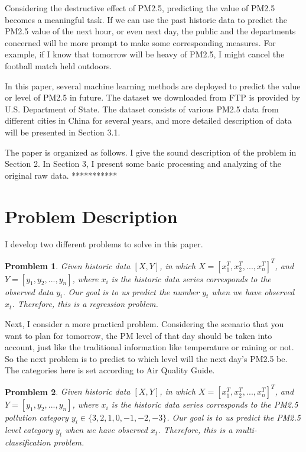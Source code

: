 \documentclass{sig-alternate}
\begin{document}
Considering the destructive effect of PM2.5, predicting the value of PM2.5 becomes a meaningful task. If we can use the past historic data to predict the PM2.5 value of the next hour, or even next day, the public and the departments concerned will be more prompt to make some corresponding measures. For example, if I know that tomorrow will be heavy of PM2.5, I might cancel the football match held outdoors.

In this paper, several machine learning methods are deployed to predict the value or level of PM2.5 in future. The dataset we downloaded from FTP is provided by U.S. Department of State\cite{data}. The dataset consists of various PM2.5 data from different cities in China for several years, and more detailed description of data will be presented in Section 3.1.

The paper is organized as follows. I give the sound description of the problem in Section 2. In Section 3, I present some basic processing and analyzing of the original raw data. ***********



\section{Problem Description}
I develop two different problems to solve in this paper.
\newtheorem{theorem}{Promblem}
\begin{theorem}
Given historic data $[X,Y]$, in which $X=[x_{1}^{T},x_{2}^{T},...,x_{n}^{T}]^{T}$, and $Y=[y_1, y_2, ..., y_n]$, where $x_i$ is the historic data series corresponds to the observed data $y_i$. Our goal is to us predict the number $y_t$ when we have observed $x_t$. Therefore, this is a regression problem.
\end{theorem}

Next, I consider a more practical problem. Considering the scenario that you want to plan for tomorrow, the PM level of that day should be taken into account, just like the traditional information like temperature or raining or not. So the next problem is to predict to which level will the next day's PM2.5 be. The categories here is set according to Air Quality Guide.\cite{level}

\newtheorem{theorem1}{Promblem}
\begin{theorem}
Given historic data $[X,Y]$, in which $X=[x_{1}^{T},x_{2}^{T},...,x_{n}^{T}]^{T}$, and $Y=[y_1, y_2, ..., y_n]$, where $x_i$ is the historic data series corresponds to the PM2.5 pollution category $y_i \in \{3, 2, 1, 0, -1, -2, -3\}$. Our goal is to us predict the PM2.5 level category $y_t$ when we have observed $x_t$. Therefore, this is a multi-classification problem.
\end{theorem}
\end{document}
